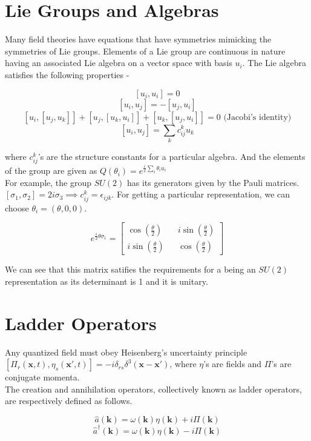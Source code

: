 \documentclass[12pt]{report}
\begin{document}
\begin{appendices}

\chapter{Lie Groups and Algebras}
Many field theories have equations that have symmetries mimicking the symmetries of Lie groups. Elements of a Lie group are continuous in nature having an associated Lie algebra on a vector space with basis $u_i$. The Lie algebra satisfies the following properties -

$$[u_i,u_i]=0$$
$$[u_i,u_j]=-[u_j,u_i]$$
$$[u_i,[u_j,u_k]]+[u_j,[u_k,u_i]]+[u_k,[u_j,u_i]]=0 \text{ (Jacobi's identity)}$$
$$[u_i,u_j]=\sum_k c^k_{ij}u_k$$

\noindent where $c^k_{ij}$'s are the structure constants for a particular algebra. And the elements of the group are given as $Q(\theta_i)=e^{\frac{i}{2}\sum_i \theta_i u_i}$\\

\noindent For example, the group $SU(2)$ has its generators given by the Pauli matrices. $[\sigma_1,\sigma_2]=2i\sigma_3\implies c^k_{ij}=\epsilon_{ijk}$. For getting a particular representation, we can choose $\theta_i=(\theta,0,0)$.

$$e^{\frac{i}{2} \theta\sigma_1}=\begin{bmatrix} \cos\left(\frac{\theta}{2}\right) && i\sin\left(\frac{\theta}{2}\right) \\ i\sin\left(\frac{\theta}{2}\right) && \cos\left(\frac{\theta}{2}\right)\end{bmatrix}$$

\noindent We can see that this matrix satifies the requirements for a being an $SU(2)$ representation as its determinant is 1 and it is unitary.

\chapter{Ladder Operators}
Any quantized field must obey Heisenberg's uncertainty principle $[\Pi_r(\boldsymbol{x},t),\eta_s(\boldsymbol{x'},t)]=-i\delta_{rs}\delta^3(\boldsymbol{x}-\boldsymbol{x'})$, where $\eta$'s are fields and $\Pi$'s are conjugate momenta.\\

\noindent The creation and annihilation operators, collectively known as ladder operators, are respectively defined as follows.

$$\hat{a}(\boldsymbol{k})=\omega(\boldsymbol{k})\eta(\boldsymbol{k})+i\Pi(\boldsymbol{k})$$
$$\hat{a}^\dagger(\boldsymbol{k})=\omega(\boldsymbol{k})\eta(\boldsymbol{k})-i\Pi(\boldsymbol{k})$$


\end{appendices}
\end{document}
